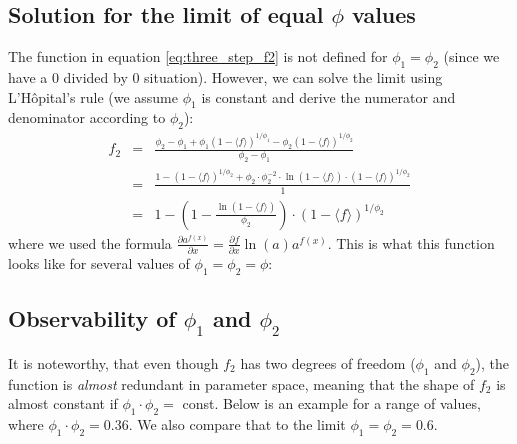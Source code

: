 \documentclass{article}
\newcommand{\fin}{\ensuremath{\langle f \rangle}}
\begin{document}
\subsection{Solution for the limit of equal \texorpdfstring{$\phi$}{phi} values}
The function in equation \ref{eq:three_step_f2} is not defined for $\phi_1 = \phi_2$ (since we have a 0 divided by 0 situation). However, we can solve the limit using L'H\^{o}pital's rule (we assume $\phi_1$ is constant and derive the numerator and denominator according to $\phi_2$):
\begin{eqnarray}
	f_2 &=& 
	\frac{\phi_2 - \phi_1 + \phi_1 (1-\fin)^{1/{\phi_1}} - \phi_2 (1-\fin)^{1/{\phi_2}}}{\phi_2 - \phi_1}
	\nonumber\\
	&=& \frac{1 - (1-\fin)^{1/{\phi_2}} + \phi_2 \cdot \phi_2^{-2} \cdot \ln{(1-\fin)} \cdot(1-\fin)^{1/{\phi_2}}}{1}
	\nonumber\\
	&=& 1 - \left(1 - \frac{\ln{(1-\fin)}}{\phi_2} \right) \cdot (1-\fin)^{1/{\phi_2}}
\end{eqnarray}
where we used the formula $\frac{\partial a^{f(x)}}{\partial x} = \frac{\partial f}{\partial x}\ln(a) a^{f(x)}$. This is what this function looks like for several values of $\phi_1 = \phi_2 = \phi$:
\begin{center}
\end{center}

\subsection{Observability of \texorpdfstring{$\phi_1$}{phi1} and \texorpdfstring{$\phi_2$}{phi2}}
It is noteworthy, that even though $f_2$ has two degrees of freedom ($\phi_1$ and $\phi_2$), the function is \textit{almost} redundant in parameter space, meaning that the shape of $f_2$ is almost constant if $\phi_1 \cdot \phi_2 =$ const. Below is an example for a range of values, where $\phi_1 \cdot \phi_2 = 0.36$. We also compare that to the limit $\phi_1 = \phi_2 = 0.6$.
\end{document}

